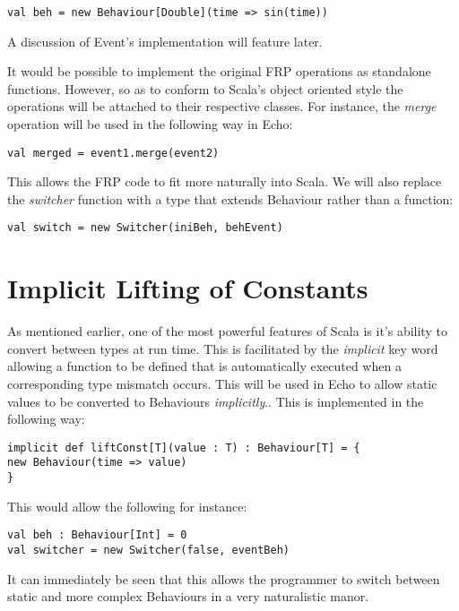 \begin{verbatim}
val beh = new Behaviour[Double](time => sin(time))
\end{verbatim}  

    A discussion of Event's implementation will feature later.
    
    It would be possible to implement the original FRP operations as standalone functions. However, so
    as to conform to Scala's object oriented style the operations will be attached to their respective
    classes. For instance, the \emph{merge} operation will be used in the following way in Echo:
    
\begin{verbatim}
val merged = event1.merge(event2)
\end{verbatim}

  This allows the FRP code to fit more naturally into Scala. We will also replace the \emph{switcher} function
  with a type that extends Behaviour rather than a function:
  
\begin{verbatim}
val switch = new Switcher(iniBeh, behEvent)
\end{verbatim}

  \section{Implicit Lifting of Constants}
    As mentioned earlier, one of the most powerful features of Scala is it's ability to convert between
    types at run time. This is facilitated by the \emph{implicit} key word allowing a function to be defined
    that is automatically executed when a corresponding type mismatch occurs. This will be used in Echo to allow 
    static values to be converted to Behaviours \emph{implicitly}.. This is implemented in the following way:  

\begin{verbatim}
implicit def liftConst[T](value : T) : Behaviour[T] = {
new Behaviour(time => value)
}
\end{verbatim}              
    
    This would allow the following for instance:

\begin{verbatim}
val beh : Behaviour[Int] = 0
val switcher = new Switcher(false, eventBeh)
\end{verbatim}       

    It can immediately be seen that this allows the programmer to switch between static and more complex
    Behaviours in a very naturalistic manor.
    
